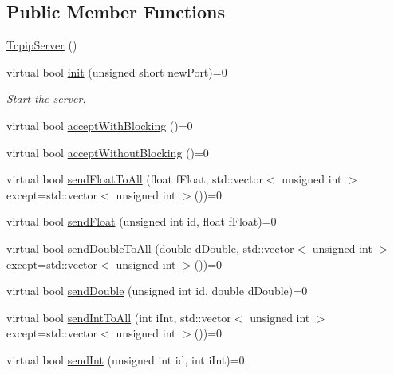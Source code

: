 \subsection*{Public Member Functions}
\begin{DoxyCompactItemize}
\item 
\hyperlink{class_rad_jav_1_1_networking_1_1_tcpip_server_aa2066a788bc727cddd5ac8487f0b3bb1}{Tcpip\+Server} ()
\item 
virtual bool \hyperlink{class_rad_jav_1_1_networking_1_1_tcpip_server_a76f18f417c6f6e56ce574eef3a65b834}{init} (unsigned short new\+Port)=0
\begin{DoxyCompactList}\small\item\em Start the server. \end{DoxyCompactList}\item 
virtual bool \hyperlink{class_rad_jav_1_1_networking_1_1_tcpip_server_a12f801213b57a944065b808983f6c377}{accept\+With\+Blocking} ()=0
\item 
virtual bool \hyperlink{class_rad_jav_1_1_networking_1_1_tcpip_server_abf0527b75ea5da517fe31933bd68503a}{accept\+Without\+Blocking} ()=0
\item 
virtual bool \hyperlink{class_rad_jav_1_1_networking_1_1_tcpip_server_ad3c5d361dee259856effb99690eef516}{send\+Float\+To\+All} (float f\+Float, std\+::vector$<$ unsigned int $>$ except=std\+::vector$<$ unsigned int $>$())=0
\item 
virtual bool \hyperlink{class_rad_jav_1_1_networking_1_1_tcpip_server_a3268420d1276db638a7e768ab3d317cf}{send\+Float} (unsigned int id, float f\+Float)=0
\item 
virtual bool \hyperlink{class_rad_jav_1_1_networking_1_1_tcpip_server_a7540e37d4635835c32b6eb2b2cbb04fa}{send\+Double\+To\+All} (double d\+Double, std\+::vector$<$ unsigned int $>$ except=std\+::vector$<$ unsigned int $>$())=0
\item 
virtual bool \hyperlink{class_rad_jav_1_1_networking_1_1_tcpip_server_abdef0ef14bc4d62933066777c180aaad}{send\+Double} (unsigned int id, double d\+Double)=0
\item 
virtual bool \hyperlink{class_rad_jav_1_1_networking_1_1_tcpip_server_af7347c3bd9264bb7f2d0bf8fa262d68c}{send\+Int\+To\+All} (int i\+Int, std\+::vector$<$ unsigned int $>$ except=std\+::vector$<$ unsigned int $>$())=0
\item 
virtual bool \hyperlink{class_rad_jav_1_1_networking_1_1_tcpip_server_ac14dcd5c88740725f45dca52bb86a5ab}{send\+Int} (unsigned int id, int i\+Int)=0
\item 

\end{DoxyCompactItemize}
